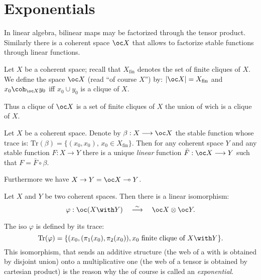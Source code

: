 \section{Exponentials}\label{exponentials}

In linear algebra, bilinear maps may be factorized through the tensor
product. Similarly there is a coherent space \(\oc X\) that allows to
factorize stable functions through linear functions.

\begin{definition}[Of course]
Let $X$ be a coherent space; recall that $X_{\mathrm{fin}}$ denotes the set of finite cliques of $X$. We define the space $\oc X$ (read ``of course $X$'') by: $\web{\oc X} = X_{\mathrm{fin}}$ and $x_0\coh_{\oc X}y_0$ iff $x_0\cup y_0$ is a clique of $X$.
\end{definition}

Thus a clique of \(\oc X\) is a set of finite cliques of \(X\) the union
of wich is a clique of \(X\).

\begin{theorem}
Let $X$ be a coherent space. Denote by $\beta:X\longrightarrow \oc X$ the stable function whose trace is: $\mathrm{Tr}(\beta) = \{(x_0, x_0),\, x_0\in X_{\mathrm{fin}}\}$. Then for any coherent space $Y$ and any stable function $F: X\longrightarrow Y$ there is a unique \emph{linear} function $\bar F:\oc X\longrightarrow Y$ such that $F = \bar F\circ \beta$.

Furthermore we have $X\imp Y = \oc X\limp Y$.
\end{theorem}

\begin{theorem}
Let $X$ and $Y$ be two coherent spaces. Then there is a linear isomorphism:
\begin{equation*}
\varphi:\oc(X\with Y)\quad\stackrel{\sim}{\longrightarrow}\quad \oc X\tens\oc Y.
\end{equation*}
\end{theorem}

The iso \(\varphi\) is defined by its trace:
\begin{equation*}
\mathrm{Tr}(\varphi) = \{(x_0, (\pi_1(x_0), \pi_2(x_0)), x_0\text{ finite clique of } X\with Y\}.
\end{equation*}
This isomorphism, that sends an additive structure (the web of a with is
obtained by disjoint union) onto a multiplicative one (the web of a
tensor is obtained by cartesian product) is the reason why the of course
is called an \emph{exponential}.

